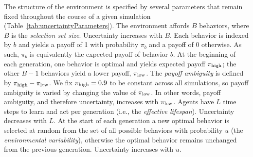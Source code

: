 \documentclass[letterpaper,11.5pt]{scrartcl}
\begin{document}
The structure of the environment is specified by several parameters that remain fixed throughout the course of a given simulation (Table~\ref{tab:uncertaintyParameters}).  The environment affords $B$ behaviors, where $B$ is the \emph{selection set size}. Uncertainty increases with $B$. Each behavior is indexed by $b$ and yields a payoff of 1 with probability $\pi_b$ and a payoff of 0 otherwise. As such, $\pi_b$ is equivalently the expected
payoff of behavior $b$. At the beginning of each generation, one behavior is optimal and yields expected payoff $\pi_{\mathrm{high}}$; the other $B-1$ behaviors yield a lower payoff, $\pi_{\mathrm{low}}$. The \emph{payoff ambiguity} is defined by $\pi_{\mathrm{high}} - \pi_{\mathrm{low}}$. We fix $\pi_{\mathrm{high}} = 0.9$ to be constant across all simulations, so payoff ambiguity is varied by changing the value of $\pi_{\mathrm{low}}$. In other words, payoff ambiguity, and therefore uncertainty, increases with $\pi_{\mathrm{low}}$.  Agents have $L$ time steps to learn and act per generation (i.e., the \emph{effective lifespan}). Uncertainty decreases with $L$. At the start of each generation a new optimal behavior is selected at random from the set of all possible behaviors with probability $u$ (the \emph{environmental variability}), otherwise the optimal behavior remains unchanged from the previous generation. Uncertainty increases with $u$.
\end{document}
